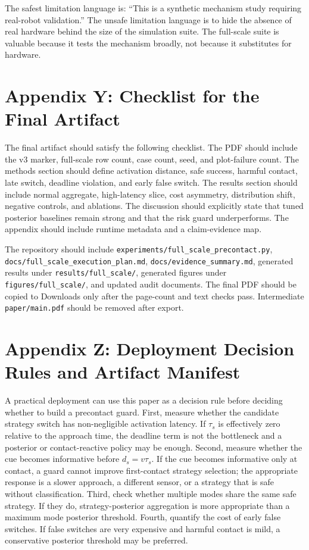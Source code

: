 \documentclass{article}
\begin{document}
The safest limitation language is: ``This is a synthetic mechanism study requiring real-robot validation.'' The unsafe limitation language is to hide the absence of real hardware behind the size of the simulation suite. The full-scale suite is valuable because it tests the mechanism broadly, not because it substitutes for hardware.

\section{Appendix Y: Checklist for the Final Artifact}

The final artifact should satisfy the following checklist. The PDF should include the v3 marker, full-scale row count, case count, seed, and plot-failure count. The methods section should define activation distance, safe success, harmful contact, late switch, deadline violation, and early false switch. The results section should include normal aggregate, high-latency slice, cost asymmetry, distribution shift, negative controls, and ablations. The discussion should explicitly state that tuned posterior baselines remain strong and that the risk guard underperforms. The appendix should include runtime metadata and a claim-evidence map.

The repository should include \texttt{experiments/full\_scale\_precontact.py}, \texttt{docs/full\_scale\_execution\_plan.md}, \texttt{docs/evidence\_summary.md}, generated results under \texttt{results/full\_scale/}, generated figures under \texttt{figures/full\_scale/}, and updated audit documents. The final PDF should be copied to Downloads only after the page-count and text checks pass. Intermediate \texttt{paper/main.pdf} should be removed after export.

\section{Appendix Z: Deployment Decision Rules and Artifact Manifest}

A practical deployment can use this paper as a decision rule before deciding whether to build a precontact guard. First, measure whether the candidate strategy switch has non-negligible activation latency. If $\tau_s$ is effectively zero relative to the approach time, the deadline term is not the bottleneck and a posterior or contact-reactive policy may be enough. Second, measure whether the cue becomes informative before $d_s=v\tau_s$. If the cue becomes informative only at contact, a guard cannot improve first-contact strategy selection; the appropriate response is a slower approach, a different sensor, or a strategy that is safe without classification. Third, check whether multiple modes share the same safe strategy. If they do, strategy-posterior aggregation is more appropriate than a maximum mode posterior threshold. Fourth, quantify the cost of early false switches. If false switches are very expensive and harmful contact is mild, a conservative posterior threshold may be preferred.
\end{document}
